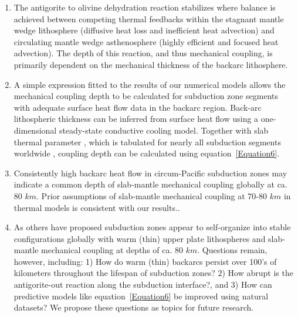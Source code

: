 \documentclass[draft]{assets/agujournal2019}
\begin{document}
\begin{enumerate}
 \item The antigorite to olivine dehydration reaction stabilizes where balance is achieved between competing thermal feedbacks within the stagnant mantle wedge lithosphere (diffusive heat loss and inefficient heat advection) and circulating mantle wedge asthenosphere (highly efficient and focused heat advection). The depth of this reaction, and thus mechanical coupling, is primarily dependent on the mechanical thickness of the backarc lithosphere.

 \item A simple expression fitted to the results of our numerical models allows the mechanical coupling depth to be calculated for subduction zone segments with adequate surface heat flow data in the backarc region. Back-arc lithospheric thickness can be inferred from surface heat flow using a one-dimensional steady-state conductive cooling model. Together with slab thermal parameter , which is tabulated for nearly all subduction segments worldwide \cite{Syracuse2006, Syracuse2010}, coupling depth can be calculated using equation~\ref{Equation6}.

 \item Consistently high backarc heat flow in circum-Pacific subduction zones \cite{Currie2006, Wada2009} may indicate a common depth of slab-mantle mechanical coupling globally at ca. 80 $km$. Prior assumptions of slab-mantle mechanical coupling at 70-80 $km$ in thermal models is consistent with our results..

 \item As others have proposed \cite{Currie2006, Wada2009} subduction zones appear to self-organize into stable configurations globally with warm (thin) upper plate lithospheres and slab-mantle mechanical coupling at depths of ca. 80 $km$. Questions remain, however, including: 1) How do warm (thin) backarcs persist over 100's of kilometers throughout the lifespan of subduction zones? 2) How abrupt is the antigorite-out reaction along the subduction interface?, and 3) How can predictive models like equation~\ref{Equation6} be improved using natural datasets? We propose these questions as topics for future research.

\end{enumerate}

\appendix
\section{}
\end{document}
